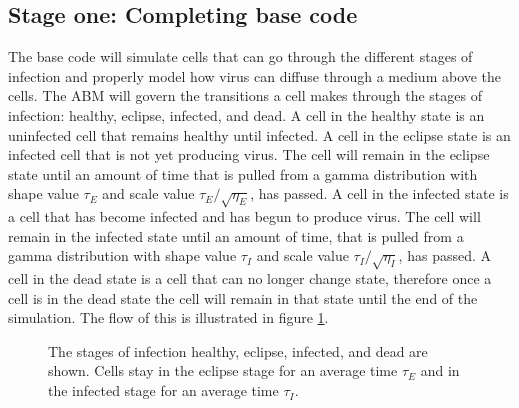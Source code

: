 \documentclass[a4paper]{article}
\begin{document}
\subsection{Stage one: Completing base code}
The base code will simulate cells that can go through the different stages of infection and properly model how virus can diffuse through a medium above the cells. The ABM will govern the transitions a cell makes through the stages of infection: healthy, eclipse, infected, and dead. A cell in the healthy state is an uninfected cell that remains healthy until infected. A cell in the eclipse state is an infected cell that is not yet producing virus. The cell will remain in the eclipse state until an amount of time that is pulled from a gamma distribution  with shape value $\tau_E$ and scale value $\tau_E/\sqrt{\eta_E}$, has passed. A cell in the infected state is a cell that has become infected and has begun to produce virus. The cell will remain in the infected state until an amount of time, that is pulled from a gamma distribution with shape value $\tau_I$ and scale value $\tau_I/\sqrt{\eta_I}$, has passed. A cell in the dead state is a cell that can no longer change state, therefore once a cell is in the dead state the cell will remain in that state until the end of the simulation. The flow of this is illustrated in figure \ref{fig:stages_of_infection}. 

\begin{figure}[h]
    \centering
    \caption{The stages of infection healthy, eclipse, infected, and dead are shown. Cells stay in  the eclipse stage for an average time $\tau_E$ and in the infected stage for an average time $\tau_I$.}
    \label{fig:stages_of_infection}
\end{figure}
\end{document}
